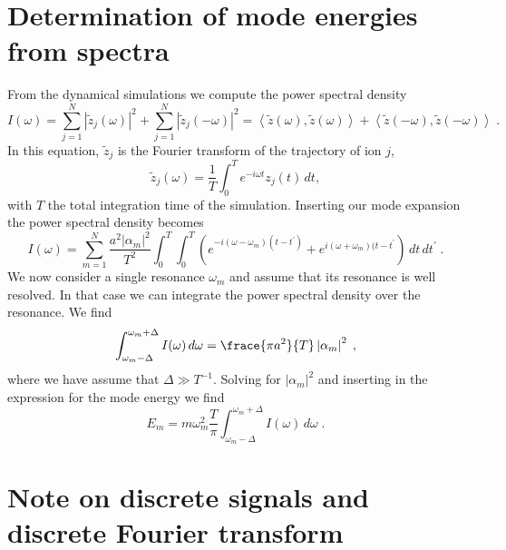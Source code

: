 \documentclass[aps, pra, preprint]{revtex4-1}
\begin{document}
\section{Determination of mode energies from spectra}

From the dynamical simulations we compute the power spectral
density
\begin{equation}
  I(\omega) =
    \sum_{j=1}^N\left| \tilde{z}_j(\omega) \right|^2 +
    \sum_{j=1}^N\left| \tilde{z}_j(-\omega) \right|^2 =
    \left\langle \tilde{z}(\omega), \tilde{z}(\omega)\right \rangle +
    \left\langle \tilde{z}(-\omega), \tilde{z}(-\omega)\right \rangle 
    \;.\label{eqn:psd}
\end{equation}
In this equation, $\tilde{z}_j$ is the Fourier transform of the
trajectory of ion $j$,
\begin{equation}
  \tilde{z}_j(\omega) = \frac{1}{T}\int_0^T e^{-i\omega t}z_j(t)\, dt,
\end{equation}
with $T$ the total integration time of the simulation. Inserting
our mode expansion the power spectral density becomes
\begin{equation}
  I(\omega) =
  \sum_{m=1}^N\frac{a^2 \left| \alpha_m \right|^2}{T^2}
  \int_0^T\int_0^T\left( e^{-i(\omega-\omega_m)(t-t^\prime)} +
    e^{i(\omega+\omega_m)(t-t^\prime} \right)\,dt\,dt^\prime\;.
\end{equation}
We now consider a single resonance $\omega_m$ and assume that
its resonance is well resolved. In that case we can integrate the
power spectral density over the resonance. We find
\begin{equation}
  \int_{\omega_m-\Delta}^{\omega_m+\Delta} I(\omega)\,d\omega =
  \frace{\pi a^2}{T}\left| \alpha_m \right|^2\;,
\end{equation}
where we have assume that $\Delta\gg T^{-1}$. Solving for
$|\alpha_m|^2$ and inserting in the expression for the mode
energy we find
\begin{equation}
  E_m = m\omega_m^2\frac{T}{\pi}
        \int_{\omega_m-\Delta}^{\omega_m+\Delta}I(\omega)\,d\omega\;.
\end{equation} 


\section{Note on discrete signals and discrete Fourier transform}
\end{document}
